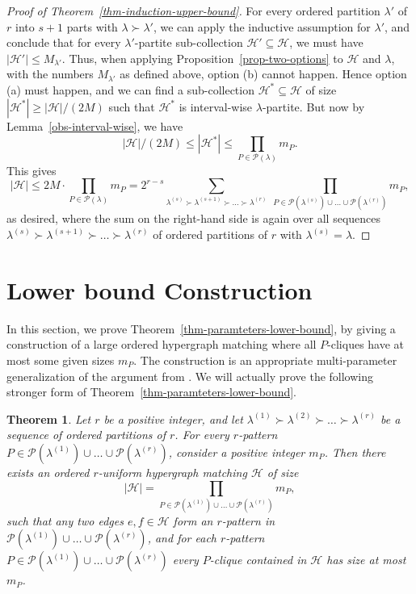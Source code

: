 \documentclass[11pt]{article}
\newtheorem{theorem}{Theorem}[section]
\theoremstyle{definition}
\numberwithin{equation}{section}
\numberwithin{figure}{section}
\newcommand{\su}{\subseteq}
\newcommand{\HH}{\mathcal{H}}
\newcommand{\PP}{\mathcal{P}}
\begin{document}
\begin{proof}[Proof of Theorem~\ref{thm-induction-upper-bound}]
    For every ordered partition $\lambda'$ of $r$ into $s+1$ parts with $\lambda\succ\lambda'$, we can apply the inductive assumption for $\lambda'$, and conclude that for every $\lambda'$-partite sub-collection $\HH'\su \HH$, we must have $|\HH'|\le M_{\lambda'}$. Thus, when applying Proposition~\ref{prop-two-options} to $\HH$ and $\lambda$, with the numbers $M_{\lambda'}$ as defined above, option (b) cannot happen. Hence option (a) must happen, and we can find a sub-collection $\HH^*\su \HH$ of size $|\HH^*|\ge |\HH|/(2M)$ such that $\HH^*$ is interval-wise $\lambda$-partite. But now by Lemma~\ref{obs-interval-wise}, we have
    \[|\HH|/(2M)\le |\HH^*|\le \prod_{P\in \PP(\lambda)} m_{P}.\]
    This gives
    \[|\HH|\le 2M\cdot \prod_{P\in \PP(\lambda)} m_{P}=2^{r-s} \sum_{\lambda^{(s)} \succ \lambda^{(s+1)} \succ \dots \succ \lambda^{(r)}}\ \prod_{ P\in \PP(\lambda^{(s)})\cup\dots\cup \PP(\lambda^{(r)}) } m_{P},\]
    as desired, where the sum on the right-hand side is again over all sequences $\lambda^{(s)} \succ \lambda^{(s+1)} \succ \dots \succ \lambda^{(r)}$ of ordered partitions of $r$ with $\lambda^{(s)}=\lambda$.
    \end{proof}


\section{Lower bound Construction}
\label{sect-lower-bound}



In this section, we prove Theorem~\ref{thm-paramteters-lower-bound}, by giving a construction of a large ordered hypergraph matching where all $P$-cliques have at most some given sizes $m_P$. The construction is an appropriate multi-parameter generalization of the argument from \cite[Section 4]{AJKS}. We will actually prove the following stronger form of Theorem~\ref{thm-paramteters-lower-bound}.

\begin{theorem} \label{thm-paramteters-lower-bound-stronger}
Let $r$ be a positive integer, and let $\lambda^{(1)} \succ \lambda^{(2)} \succ \dots \succ \lambda^{(r)}$ be a sequence of ordered partitions of $r$. For every $r$-pattern $P\in \PP(\lambda^{(1)})\cup\dots\cup \PP(\lambda^{(r)})$, consider a positive integer $m_P$. Then there exists an  ordered $r$-uniform hypergraph matching $\HH$ of size
\[|\HH|=\prod_{P\in \PP(\lambda^{(1)})\cup\dots\cup \PP(\lambda^{(r)})} m_{P},\]
such that any two edges $e,f\in \HH$ form an $r$-pattern in $\PP(\lambda^{(1)})\cup\dots\cup \PP(\lambda^{(r)})$, and for each $r$-pattern $P\in \PP(\lambda^{(1)})\cup\dots\cup \PP(\lambda^{(r)})$ every $P$-clique contained in $\HH$ has size at most $m_P$.
\end{theorem}
\end{document}
